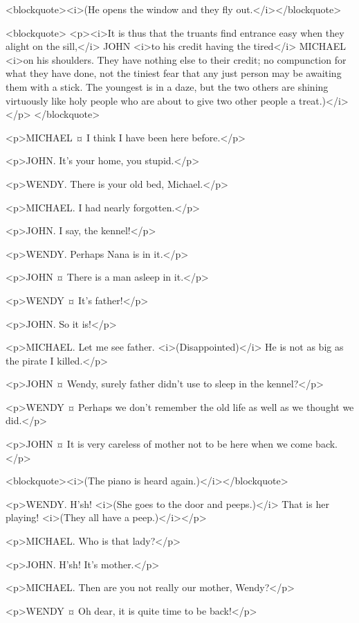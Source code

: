 <blockquote><i>(He opens the window and they fly out.</i></blockquote>

<blockquote> <p><i>It is thus that the truants find entrance easy when they alight on the sill,</i> JOHN <i>to his credit having the tired</i> MICHAEL <i>on his shoulders. They have nothing else to their credit; no compunction for what they have done, not the tiniest fear that any just person may be awaiting them with a stick. The youngest is in a daze, but the two others are shining virtuously like holy people who are about to give two other people a treat.)</i></p> </blockquote>

<p>MICHAEL ¤
I think I have been here before.</p>

<p>JOHN. It's your home, you stupid.</p>

<p>WENDY. There is your old bed, Michael.</p>

<p>MICHAEL. I had nearly forgotten.</p>

<p>JOHN. I say, the kennel!</p>

<p>WENDY. Perhaps Nana is in it.</p>

<p>JOHN ¤
There is a man asleep in it.</p>

<p>WENDY ¤
It's father!</p>

<p>JOHN. So it is!</p>

<p>MICHAEL. Let me see father. <i>(Disappointed)</i> He is not as big as the pirate I killed.</p>

<p>JOHN ¤
Wendy, surely father didn't use to sleep in the kennel?</p>

<p>WENDY ¤
Perhaps we don't remember the old life as well as we thought we did.</p>

<p>JOHN ¤
It is very careless of mother not to be here when we come back.</p>

<blockquote><i>(The piano is heard again.)</i></blockquote>

<p>WENDY. H'sh! <i>(She goes to the door and peeps.)</i> That is her playing! <i>(They all have a peep.)</i></p>

<p>MICHAEL. Who is that lady?</p>

<p>JOHN. H'sh! It's mother.</p>

<p>MICHAEL. Then are you not really our mother, Wendy?</p>

<p>WENDY ¤
Oh dear, it is quite time to be back!</p>

